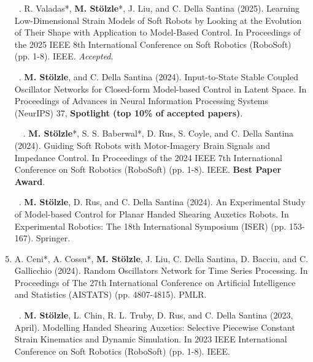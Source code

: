 \begin{enumerate}
    \item[\faFileTextO \, \stepcounter{enumi}\arabic{enumi}.] R. Valadas*, \textbf{M. Stölzle}*, J. Liu, and C. Della Santina (2025). Learning Low-Dimensional Strain Models of Soft Robots by Looking at the Evolution of Their Shape with Application to Model-Based Control. In Proceedings of the 2025 IEEE 8th International Conference on Soft Robotics (RoboSoft) (pp. 1-8). IEEE. \emph{Accepted}.
    \item[\faFileTextO \, \stepcounter{enumi}\arabic{enumi}.] \textbf{M. Stölzle}, and C. Della Santina (2024). Input-to-State Stable Coupled Oscillator Networks for Closed-form Model-based Control in Latent Space. In Proceedings of Advances in Neural Information Processing Systems (NeurIPS) 37, \textbf{Spotlight (top 10\% of accepted papers)}.
    \item[\faFileTextO \, \faTrophy \, \stepcounter{enumi}\arabic{enumi}.] \textbf{M. Stölzle}*, S. S. Baberwal*, D. Rus, S. Coyle, and C. Della Santina (2024). Guiding Soft Robots with Motor-Imagery Brain Signals and Impedance Control. In Proceedings of the 2024 IEEE 7th International Conference on Soft Robotics (RoboSoft) (pp. 1-8). IEEE. \textbf{Best Paper Award}.
    \item[\faFileTextO \, \stepcounter{enumi}\arabic{enumi}.] \textbf{M. Stölzle}, D. Rus, and C. Della Santina (2024). An Experimental Study of Model-based Control for Planar Handed Shearing Auxetics Robots. In Experimental Robotics: The 18th International Symposium (ISER) (pp. 153-167). Springer.
    \item A. Ceni*, A. Cossu*, \textbf{M. Stölzle}, J. Liu, C. Della Santina, D. Bacciu, and C. Gallicchio (2024). Random Oscillators Network for Time Series Processing. In Proceedings of The 27th International Conference on Artificial Intelligence and Statistics (AISTATS) (pp. 4807-4815). PMLR.
    \item[\faFileTextO \, \stepcounter{enumi}\arabic{enumi}.] \textbf{M. Stölzle}, L. Chin, R. L. Truby, D. Rus, and C. Della Santina (2023, April). Modelling Handed Shearing Auxetics: Selective Piecewise Constant Strain Kinematics and Dynamic Simulation. In 2023 IEEE International Conference on Soft Robotics (RoboSoft) (pp. 1-8). IEEE.

\end{enumerate}
